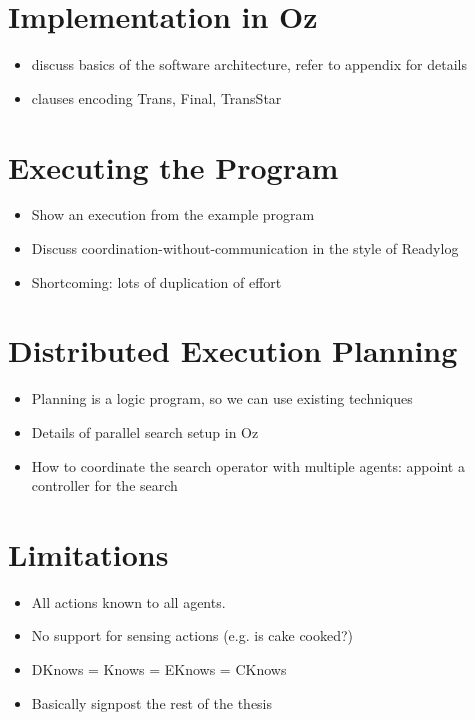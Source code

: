 \section{Implementation in Oz}
\begin{itemize}
\item discuss basics of the software architecture, refer to appendix for details
\item clauses encoding Trans, Final, TransStar
\end{itemize}

\section{Executing the Program}
\begin{itemize}
\item Show an execution from the example program
\item Discuss coordination-without-communication in the style of Readylog
\item Shortcoming: lots of duplication of effort
\end{itemize}

\section{Distributed Execution Planning}
\begin{itemize}
\item Planning is a logic program, so we can use existing techniques
\item Details of parallel search setup in Oz
\item How to coordinate the search operator with multiple agents: appoint a controller for the search
\end{itemize}

\section{Limitations}
\begin{itemize}
\item All actions known to all agents. 
\item No support for sensing actions (e.g. is cake cooked?)
\item DKnows = Knows = EKnows = CKnows
\item Basically signpost the rest of the thesis
\end{itemize}

